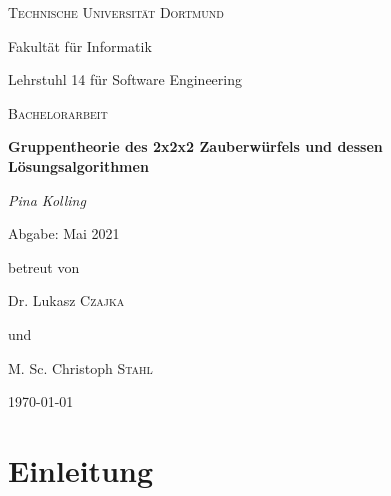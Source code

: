 \documentclass[12pt,a4paper, usenames, dvipsnames]{article}
\begin{document}
\begin{titlepage}
	\centering
	{\scshape\LARGE Technische Universität Dortmund \par}
	Fakultät für Informatik \par
	Lehrstuhl 14 für Software Engineering \par
	\vspace{1cm}
	{\scshape\Large Bachelorarbeit \par }
	\vspace{1.5cm}
	{\huge\bfseries  Gruppentheorie des 2x2x2 Zauberwürfels und dessen Lösungsalgorithmen \par}
	\vspace{2cm}
	{\Large\itshape Pina Kolling\par}
	\vspace{0.5cm}
	{Abgabe: Mai 2021 \par }
	\vfill
	betreut von\par
	Dr. Lukasz \textsc{Czajka} \par 
	und \par 
	M. Sc. Christoph \textsc{Stahl} 

	\vfill

	{\large \today\par}
\end{titlepage}


\tableofcontents

\thispagestyle{empty} 



\newpage

\setcounter{page}{1} 



















\section{Einleitung}
\end{document}
